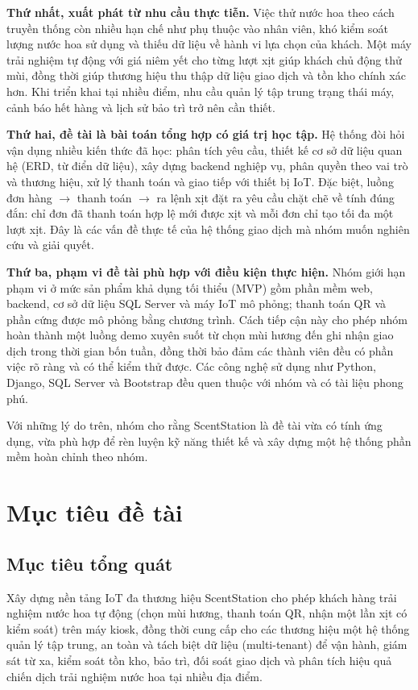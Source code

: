 \textbf{Thứ nhất, xuất phát từ nhu cầu thực tiễn.} Việc thử nước hoa theo cách truyền thống còn nhiều hạn chế như phụ thuộc vào nhân viên, khó kiểm soát lượng nước hoa sử dụng và thiếu dữ liệu về hành vi lựa chọn của khách. Một máy trải nghiệm tự động với giá niêm yết cho từng lượt xịt giúp khách chủ động thử mùi, đồng thời giúp thương hiệu thu thập dữ liệu giao dịch và tồn kho chính xác hơn. Khi triển khai tại nhiều điểm, nhu cầu quản lý tập trung trạng thái máy, cảnh báo hết hàng và lịch sử bảo trì trở nên cần thiết.
 
\textbf{Thứ hai, đề tài là bài toán tổng hợp có giá trị học tập.} Hệ thống đòi hỏi vận dụng nhiều kiến thức đã học: phân tích yêu cầu, thiết kế cơ sở dữ liệu quan hệ (ERD, từ điển dữ liệu), xây dựng backend nghiệp vụ, phân quyền theo vai trò và thương hiệu, xử lý thanh toán và giao tiếp với thiết bị IoT. Đặc biệt, luồng đơn hàng $\rightarrow$ thanh toán $\rightarrow$ ra lệnh xịt đặt ra yêu cầu chặt chẽ về tính đúng đắn: chỉ đơn đã thanh toán hợp lệ mới được xịt và mỗi đơn chỉ tạo tối đa một lượt xịt. Đây là các vấn đề thực tế của hệ thống giao dịch mà nhóm muốn nghiên cứu và giải quyết.
 
\textbf{Thứ ba, phạm vi đề tài phù hợp với điều kiện thực hiện.} Nhóm giới hạn phạm vi ở mức sản phẩm khả dụng tối thiểu (MVP) gồm phần mềm web, backend, cơ sở dữ liệu SQL Server và máy IoT mô phỏng; thanh toán QR và phần cứng được mô phỏng bằng chương trình. Cách tiếp cận này cho phép nhóm hoàn thành một luồng demo xuyên suốt từ chọn mùi hương đến ghi nhận giao dịch trong thời gian bốn tuần, đồng thời bảo đảm các thành viên đều có phần việc rõ ràng và có thể kiểm thử được. Các công nghệ sử dụng như Python, Django, SQL Server và Bootstrap đều quen thuộc với nhóm và có tài liệu phong phú.
 
Với những lý do trên, nhóm cho rằng ScentStation là đề tài vừa có tính ứng dụng, vừa phù hợp để rèn luyện kỹ năng thiết kế và xây dựng một hệ thống phần mềm hoàn chỉnh theo nhóm.

\section{Mục tiêu đề tài}
\subsection{Mục tiêu tổng quát}
Xây dựng nền tảng IoT đa thương hiệu ScentStation cho phép khách hàng trải nghiệm nước hoa tự động (chọn mùi hương, thanh toán QR, nhận một lần xịt có kiểm soát) trên máy kiosk, đồng thời cung cấp cho các thương hiệu một hệ thống quản lý tập trung, an toàn và tách biệt dữ liệu (multi-tenant) để vận hành, giám sát từ xa, kiểm soát tồn kho, bảo trì, đối soát giao dịch và phân tích hiệu quả chiến dịch trải nghiệm nước hoa tại nhiều địa điểm.
